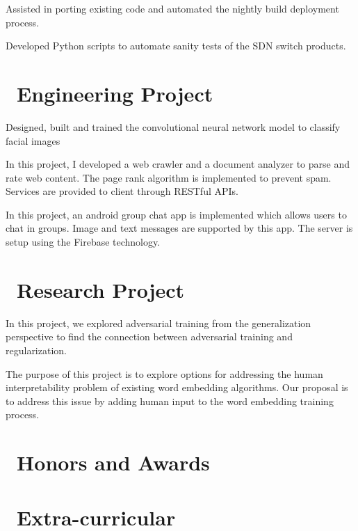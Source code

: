 \documentclass{resume}
\begin{document}
Assisted in porting existing code and automated the nightly build deployment process.


Developed Python scripts to automate sanity tests of the SDN switch products.

\section{\faUsers\ Engineering Project}
Designed, built and trained the convolutional neural network model to classify facial images

In this project, I developed a web crawler and a document analyzer to parse and rate web content. The page rank algorithm is implemented to prevent spam. Services are provided to client through RESTful APIs.

In this project, an android group chat app is implemented which allows users to chat in groups. Image and text messages are supported by this app. The server is setup using the Firebase technology. 

\section{\faUsers\ Research Project}
In this project, we explored adversarial training from the generalization perspective to find the connection between adversarial training and regularization.

The purpose of this project is to explore options for addressing the human interpretability problem of existing word embedding algorithms. Our proposal is to address this issue by adding human input to the word embedding training process.

\section{\faHeartO\ Honors and Awards}

\section{\faInfo\ Extra-curricular}

%
%
\end{document}
